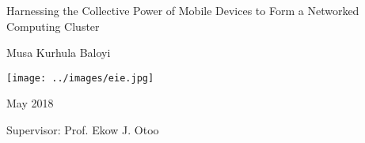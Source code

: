 \documentclass[12pt]{aimsessay}
\theoremstyle{plain}
\theoremstyle{definition}
\begin{document}
\thispagestyle{empty}
\begin{center}
	\begin{minipage}{0.75\linewidth}
		\centering

		{\Large Harnessing the Collective Power of Mobile Devices to Form a Networked Computing Cluster\par}
		\vspace{3cm}
		
		{\Large Musa Kurhula Baloyi\par}
		\vspace{3cm}
		
		\texttt{[image: ../images/eie.jpg]}
		\vspace{3cm}
		
		{\Large May 2018}
		
		\vspace{2cm}
		{\Large Supervisor: Prof. Ekow J. Otoo\par}
	\end{minipage}
\end{center}
\clearpage



\tableofcontents

\newpage
\listoffigures

\newpage
\listoftables

\printnoidxglossary

\pagestyle{myheadings}





\renewcommand{\bibname}{References}
\nocite{*}

\raggedright


\printglossary
\end{document}
